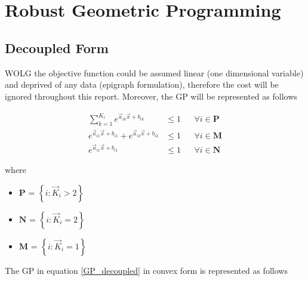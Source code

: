 \section{Robust Geometric Programming}

\subsection{Decoupled Form}
WOLG the objective function could be assumed linear (one dimensional variable) and
deprived of any data (epigraph formulation), therefore the cost will be ignored throughout this report.
Moreover, the GP will be represented as follows

\begin{equation}
\begin{aligned}
\textstyle{\sum}_{k=1}^{K_i}e^{\vec{a}_{ik}\vec{x} + b_{ik}} &\leq 1 &&\forall i \in \mathbf{P}\\
e^{\vec{a}_{i1}\vec{x} + b_{i1}} + e^{\vec{a}_{i2}\vec{x} + b_{i2}} &\leq 1 &&\forall i \in \mathbf{M}\\
e^{\vec{a}_{i1}\vec{x} + b_{i1}} &\leq 1 &&\forall i \in \mathbf{N}
\end{aligned}
\label{GP_decoupled}
\end{equation}

where
\begin{itemize}
\item $\mathbf{P}$ = $\left\{i : \vec{K}_i > 2\right\}$
\item $\mathbf{N}$ = $\left\{i : \vec{K}_i = 2\right\}$
\item $\mathbf{M}$ = $\left\{i : \vec{K}_i = 1\right\}$
\end{itemize}

The GP in equation \eqref{GP_decoupled} in convex form is represented as follows

